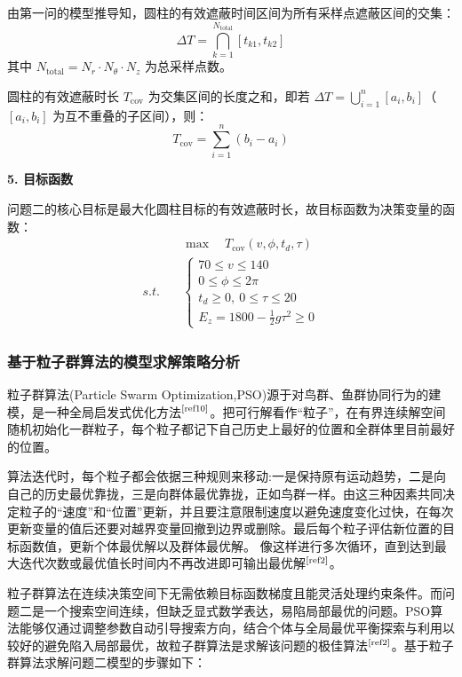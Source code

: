 \documentclass[withoutpreface]{cumcmthesis}
\begin{document}
由第一问的模型推导知，圆柱的有效遮蔽时间区间为所有采样点遮蔽区间的交集：
\begin{equation}
    \Delta T = \bigcap_{k=1}^{N_{\text{total}}} [t_{k1}, t_{k2}]
\end{equation}
其中 $N_{\text{total}} = N_r \cdot N_\theta \cdot N_z$ 为总采样点数。

圆柱的有效遮蔽时长 $T_{\text{cov}}$ 为交集区间的长度之和，即若 $\Delta T = \bigcup_{i=1}^{n} [a_i, b_i]$（$[a_i, b_i]$ 为互不重叠的子区间），则：
\begin{equation}
    T_{\text{cov}} = \sum_{i=1}^{n} (b_i - a_i)
\end{equation}


\textbf{5. 目标函数}

问题二的核心目标是最大化圆柱目标的有效遮蔽时长，故目标函数为决策变量的函数：
\begin{equation}
    \label{问题二模型}
    \begin{aligned}
        &\max \quad T_{\text{cov}}(v, \phi, t_d, \tau) \\
        s.t.\quad &\begin{cases}
70 \leq v \leq 140 \\
0 \leq \phi \leq 2\pi \\
t_d \geq 0,\ 0\leq \tau \leq 20 \\
E_z = 1800 - \frac{1}{2} g \tau^2 \geq 0
\end{cases}
\end{aligned}
\end{equation}

\subsubsection{基于粒子群算法的模型求解策略分析}
粒子群算法(Particle Swarm Optimization,PSO)源于对鸟群、鱼群协同行为的建模，是一种全局启发式优化方法$^\text{\cite{ref10}}$。把可行解看作“粒子”，在有界连续解空间随机初始化一群粒子，每个粒子都记下自己历史上最好的位置和全群体里目前最好的位置。

算法迭代时，每个粒子都会依据三种规则来移动:一是保持原有运动趋势，二是向自己的历史最优靠拢，三是向群体最优靠拢，正如鸟群一样。由这三种因素共同决定粒子的“速度”和“位置”更新，并且要注意限制速度以避免速度变化过快，在每次更新变量的值后还要对越界变量回撤到边界或删除。最后每个粒子评估新位置的目标函数值，更新个体最优解以及群体最优解。
像这样进行多次循环，直到达到最大迭代次数或最优值长时间内不再改进即可输出最优解$^\text{\cite{ref2}}$。

粒子群算法在连续决策空间下无需依赖目标函数梯度且能灵活处理约束条件。而问题二是一个搜索空间连续，但缺乏显式数学表达，易陷局部最优的问题。PSO算法能够仅通过调整参数自动引导搜索方向，结合个体与全局最优平衡探索与利用以较好的避免陷入局部最优，故粒子群算法是求解该问题的极佳算法$^\text{\cite{ref2}}$。基于粒子群算法求解问题二模型的步骤如下：
\end{document}
